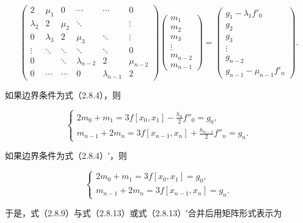 \documentclass[
  10pt,
  fontset=fandol]{ctexart}
\begin{document}
\[\begin{pmatrix}
2&\mu_1&0&\cdots&\cdots&0\\
\lambda_2&2&\mu_2&\ddots&&\vdots\\
0&\lambda_3&2&\mu_3&\ddots&\vdots\\
\vdots&\ddots&\ddots&\ddots&\ddots&0\\
0&&\ddots&\lambda_{n-2}&2&\mu_{n-2}\\
0&\cdots&\cdots&0&\lambda_{n-1}&2
\end{pmatrix}
\begin{pmatrix}m_1\\m_2\\m_3\\\vdots\\m_{n-2}\\m_{n-1}\end{pmatrix}
=\begin{pmatrix}g_1-\lambda_1f'_0\\g_2\\g_3\\\vdots\\g_{n-2}\\g_{n-1}-\mu_{n-1}f'_n\end{pmatrix}.\tag{2.8.12}\]

如果边界条件为式（2.8.4），则

\[\begin{cases}
\displaystyle2m_0+m_1=3f[x_0,x_1]-\frac{h_0}2f''_0=g_0,\\[6pt]
\displaystyle m_{n-1}+2m_n=3f[x_{n-1},x_n]+\frac{h_{n-1}}2f''_n=g_n.
\end{cases}\tag{2.8.13}\]

如果边界条件为式（2.8.4）′，则

\[\begin{cases}
2m_0+m_1=3f[x_0,x_1]=g_0,\\
m_{n-1}+2m_n=3f[x_{n-1},x_n]=g_n.
\end{cases}\tag{2.8.13'}\]

于是，式（2.8.9）与式（2.8.13）或式（2.8.13）′合并后用矩阵形式表示为
\end{document}
